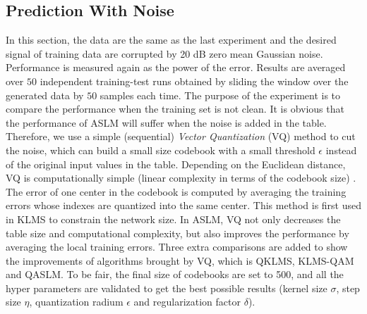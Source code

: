 \documentclass{article}
\begin{document}
\subsection{Prediction With Noise}
In this section, the data are the same as the last experiment and the desired signal of training data are corrupted by 20 dB zero mean Gaussian noise. Performance is measured again as the power of the error. Results are averaged over $ 50 $ independent training-test runs obtained by sliding the window over the generated data by $ 50 $ samples each time. The purpose of the experiment is to compare the performance when the training set is not clean. It is obvious that the performance of ASLM will suffer when the noise is added in the table. Therefore, we use a simple (sequential) \textit{Vector Quantization} (VQ) method to cut the noise,  which can build a small size codebook with a small threshold $ \epsilon $ instead of the original input values in the table. Depending on the Euclidean distance, VQ is computationally simple (linear complexity in terms of the codebook size) \cite{chen2012quantized,Liu2008}. The error of one center in the codebook is computed by averaging the training errors whose indexes are quantized into the same center. This method is first used in KLMS to constrain the network size. In ASLM, VQ not only decreases the table size and computational complexity, but also improves the performance by averaging the local training errors. Three extra comparisons are added to show the improvements of algorithms brought by VQ, which is QKLMS, KLMS-QAM and QASLM. To be fair, the final size of codebooks are set to 500, and all the hyper parameters are validated to get the best possible results (kernel size $ \sigma $, step size $ \eta $, quantization radium $ \epsilon $ and regularization factor $ \delta $). 
\end{document}
